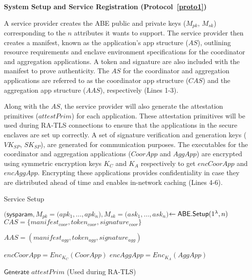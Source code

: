 \noindent
{\bf System Setup and Service Registration (Protocol~\ref{proto1})} 

\noindent
A service provider creates the ABE public and private keys ($M_{pk}$, $M_{sk}$) corresponding to the $n$ attributes it wants to support. The service provider then creates a manifest, known as the application's app structure ($AS$), outlining resource requirements and enclave environment specifications for the coordinator and aggregation applications. A token and signature are also included with the manifest to prove authenticity. The $AS$ for the coordinator and aggregation applications are referred to as the coordinator app structure ($CAS$) and the aggregation app structure ($AAS$), respectively (Lines 1-3).

Along with the $AS$, the service provider will also generate the attestation primitives ($attestPrim$) for each application. These attestation primitives will be used during RA-TLS connections to ensure that the applications in the secure enclaves are set up correctly. A set of signature verification and generation keys ($VK_{SP}$, $SK_{SP}$), are generated for communication purposes. The executables for the coordinator and aggregation applications ($CoorApp$ and $AggApp$) are encrypted using symmetric encryption keys $K_{C}$ and  $K_{A}$ respectively to get $encCoorApp$ and $encAggApp$. Encrypting these applications provides confidentiality in case they are distributed ahead of time and enables in-network caching (Lines 4-6). 
\bigskip
{}
\setcounter{algorithm}{0}
\begin{algorithm}[t]
\small
\caption{Service Setup}
\label{proto1}
\begin{algorithmic}[1]
\item[]
\begin{center}
\end{center}
\STATE $\Big(\mathsf{sysparam}$$,M_{pk} = (apk_{1},$$\dots, $$apk_{n}),$$  M_{sk} = $$(ask_{1},$$ \dots,$$ ask_{n}\Big)$$ \leftarrow \mathsf{ABE.Setup}(1^{\lambda}, n)$
\STATE $CAS = \{manifest_{coor}, token_{coor}, signature_{coor}\} $

\STATE $AAS = (manifest_{agg}, token_{agg}, signature_{agg})$



\STATE $encCoorApp  = Enc_{K_C}(CoorApp)$
\STATE $encAggApp  = Enc_{K_A}(AggApp)$



\STATE $\mathsf{Generate}$ $attestPrim$ (Used during RA-TLS) 
\end{algorithmic}
\end{algorithm}











